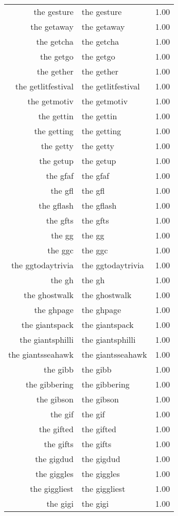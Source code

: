 \begin{table}[ht]
\begin{tabular}{rlr}
  the gesture & the gesture & 1.00 \\ 
  the getaway & the getaway & 1.00 \\ 
  the getcha & the getcha & 1.00 \\ 
  the getgo & the getgo & 1.00 \\ 
  the gether & the gether & 1.00 \\ 
  the getlitfestival & the getlitfestival & 1.00 \\ 
  the getmotiv & the getmotiv & 1.00 \\ 
  the gettin & the gettin & 1.00 \\ 
  the getting & the getting & 1.00 \\ 
  the getty & the getty & 1.00 \\ 
  the getup & the getup & 1.00 \\ 
  the gfaf & the gfaf & 1.00 \\ 
  the gfl & the gfl & 1.00 \\ 
  the gflash & the gflash & 1.00 \\ 
  the gfts & the gfts & 1.00 \\ 
  the gg & the gg & 1.00 \\ 
  the ggc & the ggc & 1.00 \\ 
  the ggtodaytrivia & the ggtodaytrivia & 1.00 \\ 
  the gh & the gh & 1.00 \\ 
  the ghostwalk & the ghostwalk & 1.00 \\ 
  the ghpage & the ghpage & 1.00 \\ 
  the giantspack & the giantspack & 1.00 \\ 
  the giantsphilli & the giantsphilli & 1.00 \\ 
  the giantsseahawk & the giantsseahawk & 1.00 \\ 
  the gibb & the gibb & 1.00 \\ 
  the gibbering & the gibbering & 1.00 \\ 
  the gibson & the gibson & 1.00 \\ 
  the gif & the gif & 1.00 \\ 
  the gifted & the gifted & 1.00 \\ 
  the gifts & the gifts & 1.00 \\ 
  the gigdud & the gigdud & 1.00 \\ 
  the giggles & the giggles & 1.00 \\ 
  the giggliest & the giggliest & 1.00 \\ 
  the gigi & the gigi & 1.00 \\ 

\end{tabular}
\end{table}
